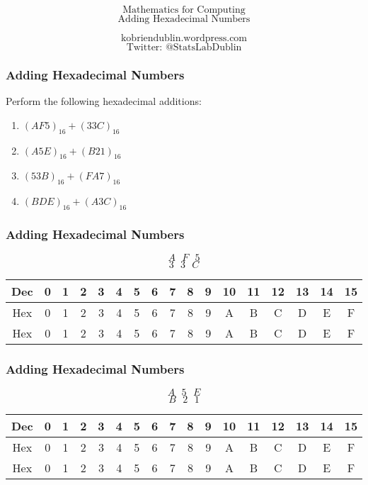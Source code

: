 \documentclass{beamer}
\begin{document}
\begin{frame}
\Huge
\[ \mbox{Mathematics for Computing} \]
\huge
\[ \mbox{Adding Hexadecimal Numbers} \]

\Large
\[ \mbox{kobriendublin.wordpress.com} \]
\[ \mbox{Twitter: @StatsLabDublin} \]
\end{frame}
\begin{frame}
\frametitle{Adding Hexadecimal Numbers}
\vspace{-2cm}
\Large
Perform the following hexadecimal additions:
\begin{enumerate}
\item $(AF5)_{16} + (33C)_{16}$
\item $(A5E)_{16} + (B21)_{16}$
\item $(53B)_{16} + (FA7)_{16}$
\item $(BDE)_{16} + (A3C)_{16}$
\end{enumerate}
\end{frame}
\begin{frame}
\frametitle{Adding Hexadecimal Numbers}
\vspace{-2cm}
\huge
\[ A \mbox{     } F  \mbox{     } 5\]
\[ 3 \mbox{     } 3  \mbox{     } C\]
\vspace{3cm}
\small
\begin{tabular}{|c|c|c|c|c|c|c|c|c|c|c|c|c|c|c|c|c|}
\hline
\textbf{Dec} & 0	&	1	&	2	&	3	&	4	&	5	&	6	&	7	&	8	&	9	&	10	&	11	&	12	&	13	&	14	&	15	\\ \hline
\hline
Hex & 0	&	1	&	2	&	3	&	4	&	5	&	6	&	7	&	8	&	9	&	A	&	B	&	C	&	D	&	E	&	F	\\ \hline
Hex & 0	&	1	&	2	&	3	&	4	&	5	&	6	&	7	&	8	&	9	&	A	&	B	&	C	&	D	&	E	&	F	\\ \hline 
\end{tabular} 
\end{frame}
\begin{frame}
\frametitle{Adding Hexadecimal Numbers}
\vspace{-2cm}
\huge
\[ A \mbox{     } 5  \mbox{     } E\]
\[ B \mbox{     } 2  \mbox{     } 1\]

\vspace{3cm}
\small
\begin{tabular}{|c|c|c|c|c|c|c|c|c|c|c|c|c|c|c|c|c|}
\hline
\textbf{Dec} & 0	&	1	&	2	&	3	&	4	&	5	&	6	&	7	&	8	&	9	&	10	&	11	&	12	&	13	&	14	&	15	\\ \hline
\hline
Hex & 0	&	1	&	2	&	3	&	4	&	5	&	6	&	7	&	8	&	9	&	A	&	B	&	C	&	D	&	E	&	F	\\ \hline
Hex & 0	&	1	&	2	&	3	&	4	&	5	&	6	&	7	&	8	&	9	&	A	&	B	&	C	&	D	&	E	&	F	\\ \hline 
\end{tabular} 
\end{frame}
\end{document}
